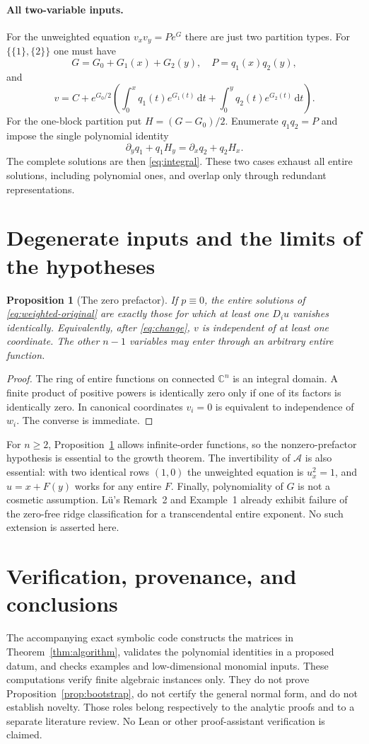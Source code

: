\documentclass[11pt]{article}
\numberwithin{equation}{section}
\newtheorem{proposition}[theorem]{Proposition}
\theoremstyle{definition}\newtheorem{definition}[theorem]{Definition}
\theoremstyle{remark}\newtheorem{remark}[theorem]{Remark}
\newcommand{\C}{\mathbb C}
\newcommand{\dd}{\,\mathrm d}
\newcommand{\Ac}{\mathcal A}
\begin{document}
\paragraph{All two-variable inputs.}
For the unweighted equation $v_xv_y=P e^G$ there are just two partition
types. For $\{\{1\},\{2\}\}$ one must have
\[
 G=G_0+G_1(x)+G_2(y),\quad P=q_1(x)q_2(y),
\]
and
\[
 v=C+e^{G_0/2}\left(\int_0^xq_1(t)e^{G_1(t)}\dd t+
                        \int_0^yq_2(t)e^{G_2(t)}\dd t\right).
\]
For the one-block partition put $H=(G-G_0)/2$. Enumerate $q_1q_2=P$
and impose the single polynomial identity
\[
 \partial_yq_1+q_1H_y=\partial_xq_2+q_2H_x.
\]
The complete solutions are then \eqref{eq:integral}. These two cases
exhaust all entire solutions, including polynomial ones, and overlap
only through redundant representations.

\section{Degenerate inputs and the limits of the hypotheses}\label{sec:degenerate}
\begin{proposition}[The zero prefactor]\label{prop:zero}
If $p\equiv0$, the entire solutions of \eqref{eq:weighted-original} are
exactly those for which at least one $D_i u$ vanishes identically.
Equivalently, after \eqref{eq:change}, $v$ is independent of at least one
coordinate. The other $n-1$ variables may enter through an arbitrary
entire function.
\end{proposition}
\begin{proof}
The ring of entire functions on connected $\C^n$ is an integral domain.
A finite product of positive powers is identically zero only if one of
its factors is identically zero. In canonical coordinates $v_i=0$
is equivalent to independence of $w_i$. The converse is immediate.
\end{proof}

For $n\geq2$, Proposition~\ref{prop:zero} allows infinite-order functions,
so the nonzero-prefactor hypothesis is essential to the growth theorem.
The invertibility of $\Ac$ is also essential: with two identical rows
$(1,0)$ the unweighted equation is $u_x^2=1$, and
$u=x+F(y)$ works for any entire $F$. Finally, polynomiality of $G$ is
not a cosmetic assumption. L\"u's Remark~2 and Example~1 already exhibit
failure of the zero-free ridge classification for a transcendental entire
exponent. No such extension is asserted here.

\section{Verification, provenance, and conclusions}
The accompanying exact symbolic code constructs the matrices in
Theorem~\ref{thm:algorithm}, validates the polynomial identities in a
proposed datum, and checks examples and low-dimensional monomial inputs.
These computations verify finite algebraic instances only. They do not
prove Proposition~\ref{prop:bootstrap}, do not certify the general
normal form, and do not establish novelty. Those roles belong respectively
to the analytic proofs and to a separate literature review. No Lean or
other proof-assistant verification is claimed.
\end{document}
